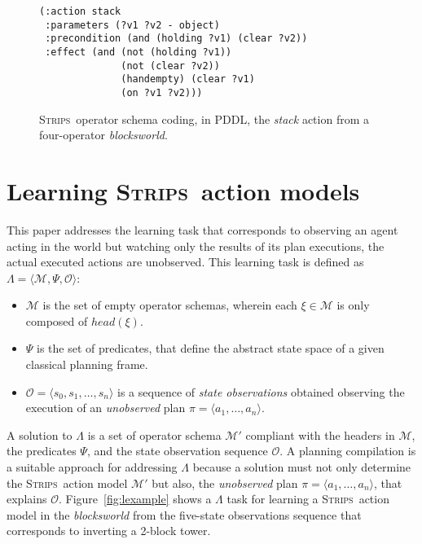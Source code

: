 \documentclass{article}
\newcommand{\tup}[1]{{\langle #1 \rangle}}
\newcommand{\strips}{\textsc{Strips}}     %
\begin{document}
\begin{figure}
\begin{footnotesize}
\begin{verbatim}
(:action stack
 :parameters (?v1 ?v2 - object)
 :precondition (and (holding ?v1) (clear ?v2))
 :effect (and (not (holding ?v1))
              (not (clear ?v2))
              (handempty) (clear ?v1)
              (on ?v1 ?v2)))
\end{verbatim}
\end{footnotesize}
 \caption{\small \strips\ operator schema coding, in PDDL, the {\em stack} action from a four-operator {\em blocksworld}.}
\label{fig:stack}
\end{figure}


\section{Learning \strips\ action models}
\label{learning_task}


This paper addresses the learning task that corresponds to observing an agent acting in the world but watching only the results of its plan executions, the actual executed actions are unobserved. This learning task is defined as $\Lambda=\tup{\mathcal{M},\Psi,\mathcal{O}}$:
\begin{itemize}
\item $\mathcal{M}$ is the set of empty operator schemas, wherein each $\xi\in\mathcal{M}$ is only composed of $head(\xi)$.
\item $\Psi$ is the set of predicates, that define the abstract state space of a given classical planning frame.
\item $\mathcal{O}=\tup{s_0,s_1,\ldots,s_{n}}$ is a sequence of {\em state observations} obtained observing the execution of an {\em unobserved} plan $\pi=\tup{a_1, \ldots, a_n}$.
\end{itemize}

A solution to $\Lambda$ is a set of operator schema $\mathcal{M}'$ compliant with the headers in $\mathcal{M}$, the predicates $\Psi$, and the state observation sequence $\mathcal{O}$. A planning compilation is a suitable approach for addressing $\Lambda$ because a solution must not only determine the \strips\ action model $\mathcal{M}'$ but also, the {\em unobserved} plan $\pi=\tup{a_1, \ldots, a_n}$, that explains $\mathcal{O}$. Figure~\ref{fig:lexample} shows a $\Lambda$ task for learning a \strips\ action model in the {\em blocksworld} from the five-state observations sequence that corresponds to inverting a 2-block tower.
\end{document}
